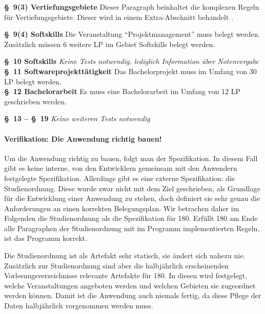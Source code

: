 \documentclass[ngerman]{article}
\begin{document}
\begin{paracol}{2}
\textbf{§~9(3) Vertiefungsgebiete}
\switchcolumn
Dieser Paragraph beinhaltet die komplexen Regeln für Vertiefungsgebiete.
Dieser wird in einem Extra-Abschnitt behandelt .
\\
\switchcolumn*

\textbf{§~9(4) Softskills}
\switchcolumn
Die Veranstaltung ``Projektmanagement'' muss belegt werden.
Zusätzlich müssen 6 weitere LP im Gebiet Softskills belegt werden.
\\
\switchcolumn*

\textbf{§~10 Softskills}
\switchcolumn
\emph{Keine Tests notwendig, lediglich Information über Notenvergabe}
\\

\textbf{§~11 Softwareprojekttätigkeit}
\switchcolumn
Das Bachelorprojekt muss im Umfang von 30 LP belegt werden.
\\

\textbf{§~12 Bachelorarbeit}
\switchcolumn
Es muss eine Bachelorarbeit im Umfang von 12 LP geschrieben werden.
\\
\switchcolumn*

\textbf{§~13 -- §~19}
\switchcolumn
\emph{Keine weiteren Tests notwendig}
\\
\switchcolumn*
\end{paracol}

\paragraph{Verifikation: Die Anwendung richtig bauen!}

Um die Anwendung richtig zu bauen, folgt man der Spezifikation.
In diesem Fall gibt es keine interne, von den Entwicklern gemeinsam mit den Anwendern festgelegte Spezifikation.
Allerdings gibt es eine externe Spezifikation: die Studienordnung.
Diese wurde zwar nicht mit dem Ziel geschrieben, als Grundlage für die Entwicklung einer Anwendung zu stehen, doch definiert sie sehr genau die Anforderungen an einen korrekten Belegungsplan.
Wir betrachen daher im Folgenden die Studienordnung als die Spezifikation für 180.
Erfüllt 180 am Ende alle Paragraphen der Studienordnung mit im Programm implementierten Regeln, ist das Programm korrekt.

Die Studienordnung ist als Artefakt sehr statisch, sie ändert sich nahezu nie.
Zusätzlich zur Studienordnung sind aber die halbjährlich erscheinenden Vorlesungsverzeichnisse relevante Artefakte für 180.
In diesen wird festgelegt, welche Veranstaltungen angeboten werden und welchen Gebieten sie zugeordnet werden können.
Damit ist die Anwendung auch niemals fertig, da diese Pflege der Daten halbjährlich vorgenommen werden muss.
\end{document}

